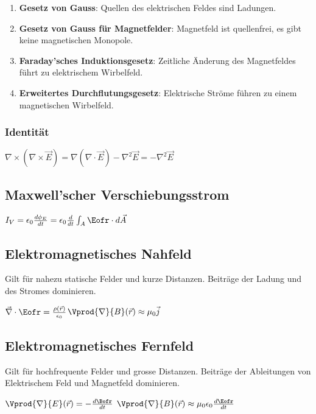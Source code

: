 \documentclass[10pt,a4paper]{scrartcl}
\begin{document}
\begin{multicols*}{3}
	\small
	\begin{enumerate}
	\compaq
	\item
	\textbf{Gesetz von Gauss}: Quellen des elektrischen Feldes sind Ladungen. 
	\item
	\textbf{Gesetz von Gauss für Magnetfelder}: Magnetfeld ist quellenfrei, es gibt keine magnetischen Monopole. 
	\item
	\textbf{Faraday'sches Induktionsgesetz}: Zeitliche Änderung des Magnetfeldes führt zu elektrischem Wirbelfeld. 
	\item
	\textbf{Erweitertes Durchflutungsgesetz}: Elektrische Ströme führen zu einem magnetischen Wirbelfeld. 
	\end{enumerate}
	\normalsize


	\subsubsection{Identität}
	
	$\nabla\times(\nabla\times \vec{E})=\nabla(\nabla\cdot\vec{E})-\nabla^2\vec{E}=-\nabla^2\vec{E}$
	
	\subsection{Maxwell'scher Verschiebungsstrom}
	
	$I_V=\epsilon_0\frac{d\phi_E}{dt}=\epsilon_0\frac{d}{dt}\int_A{\Eofr\cdot d\vec{A}}$
		
	 
	
	\subsection{Elektromagnetisches Nahfeld}
	
	Gilt für nahezu statische Felder und kurze Distanzen. Beiträge der Ladung und des Stromes dominieren.
	
	$\vec{\nabla}\cdot\Eofr=\frac{\rho(\vec{r})}{\epsilon_0}$\hfill$\Vprod{\nabla}{B}(\vec{r})\approx \mu_0\vec{j}$	
	
	 
	
	\subsection{Elektromagnetisches Fernfeld}

	Gilt für hochfrequente Felder und grosse Distanzen. Beiträge der Ableitungen von Elektrischem Feld und Magnetfeld dominieren.
	
	$\Vprod{\nabla}{E}(\vec{r})=-\frac{d\Bofr}{dt}$ \hfill $\Vprod{\nabla}{B}(\vec{r})\approx\mu_0\epsilon_0\frac{d \Eofr}{dt}$


\end{multicols*}
\end{document}
